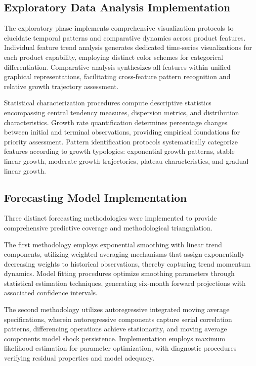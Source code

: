 \subsection{Exploratory Data Analysis Implementation}
The exploratory phase implements comprehensive visualization protocols to elucidate temporal patterns and comparative dynamics across product features. Individual feature trend analysis generates dedicated time-series visualizations for each product capability, employing distinct color schemes for categorical differentiation. Comparative analysis synthesizes all features within unified graphical representations, facilitating cross-feature pattern recognition and relative growth trajectory assessment.

Statistical characterization procedures compute descriptive statistics encompassing central tendency measures, dispersion metrics, and distribution characteristics. Growth rate quantification determines percentage changes between initial and terminal observations, providing empirical foundations for priority assessment. Pattern identification protocols systematically categorize features according to growth typologies: exponential growth patterns, stable linear growth, moderate growth trajectories, plateau characteristics, and gradual linear growth.

\subsection{Forecasting Model Implementation}
Three distinct forecasting methodologies were implemented to provide comprehensive predictive coverage and methodological triangulation.

The first methodology employs exponential smoothing with linear trend components, utilizing weighted averaging mechanisms that assign exponentially decreasing weights to historical observations, thereby capturing trend momentum dynamics. Model fitting procedures optimize smoothing parameters through statistical estimation techniques, generating six-month forward projections with associated confidence intervals.

The second methodology utilizes autoregressive integrated moving average specifications, wherein autoregressive components capture serial correlation patterns, differencing operations achieve stationarity, and moving average components model shock persistence. Implementation employs maximum likelihood estimation for parameter optimization, with diagnostic procedures verifying residual properties and model adequacy.

